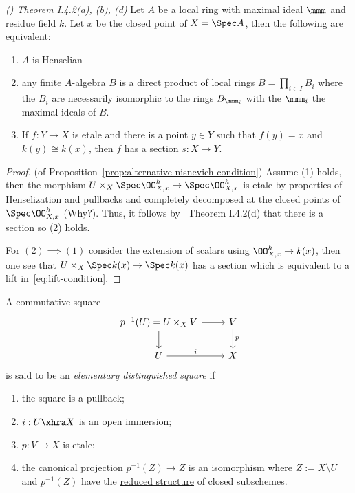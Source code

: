 \documentclass[12pt]{article}
\numberwithin{equation}{section}
\numberwithin{lemma}{section}
\numberwithin{theorem}{section}
\numberwithin{proposition}{section}
\numberwithin{corollary}{section}
\numberwithin{definition}{section}
\numberwithin{example}{section}
\numberwithin{remark}{section}
\begin{document}
\begin{theorem}{\emph{(\cite{milne1980etale}) Theorem I.4.2(a), (b), (d)}}
  Let $A$ be a local ring with maximal ideal $\mmm$ and residue field
  $k$. Let $x$ be the closed point of $X = \Spec A$, then the
  following are equivalent:
  \begin{enumerate}[label=(\alph*)]
  \item $A$ is Henselian
  \item any finite $A$-algebra $B$ is a direct product of local rings
    $B = \prod_{i \in I} B_i$ where the $B_i$ are necessarily
    isomorphic to the rings $B_{\mmm_i}$ with the $\mmm_i$ the maximal
    ideals of $B$.
  \item If $f : Y \to X$ is etale and there is a point $y \in Y$ such
    that $f(y) = x$ and $k(y) \cong k(x)$, then $f$ has a section
    $s : X \to Y$.
  \end{enumerate}
\end{theorem}

\begin{proof}{(of Proposition~\ref{prop:alternative-nisnevich-condition})}
  Assume (1) holds, then the morphism
  $U \times_X \Spec \OO^h_{X, x} \to \Spec \OO^h_{X, x}$ is etale by
  properties of Henselization and pullbacks and completely decomposed
  at the closed points of $\Spec \OO^h_{X, x}$ (Why?). Thus, it
  follows by~\cite{milne1980etale} Theorem I.4.2(d) that there is a
  section so (2) holds.

  For $(2) \implies (1)$ consider the extension of scalars using
  $\OO^{h}_{X, x} \to k(x)$, then one see that
  $U \times_X \Spec k(x) \to \Spec k(x)$ has a section which is
  equivalent to a lift in~\eqref{eq:lift-condition}.
\end{proof}

\begin{definition}
  A commutative square
  \begin{equation*}
    \begin{tikzcd}
      p^{-1}(U) = U \times_X V \arrow[d] \arrow[r] & V \arrow[d, "p"] \\
      U \arrow[r, "i"]                             & X
    \end{tikzcd}
  \end{equation*}
  is said to be an \emph{elementary distinguished square} if
  \begin{enumerate}[label=(\arabic*)]
  \item the square is a pullback;
  \item $i : U \xhra X$ is an open immersion;
  \item $p : V \to X$ is etale;
  \item the canonical projection $p^{-1}(Z) \to Z$ is an isomorphism
    where $Z := X \setminus U$ and $p^{-1}(Z)$ have the
    \href{https://stacks.math.columbia.edu/tag/01J4}{reduced
      structure} of closed subschemes.
  \end{enumerate}
\end{definition}
\end{document}
